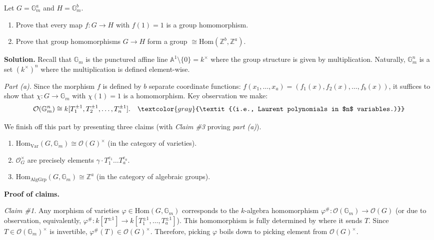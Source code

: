 \documentclass{template}
\begin{document}
\begin{problem}[Exercise 2]
    Let $G=\mathbb{G}_m^a$ and $H=\mathbb{G}_m^b$.
    \begin{enumerate}
        \item[(a)] Prove that every map $f: G \to H$ with $f(1)=1$ is a group homomorphism.
        \item[(b)] Prove that group homomorphisms $G \to H$ form a group $\cong\text{Hom}(\mathbb{Z}^b, \mathbb{Z}^a)$.
    \end{enumerate}
\end{problem}

\textbf{Solution.} Recall that $\mathbb{G}_m$ is the punctured affine line 
$\mathbb{A}^{1} \setminus \{0\} = k^{\times}$ where the group structure is given 
by multiplication. Naturally, $\mathbb{G}_m^n$ is a set $(k^{\times})^n$
where the multiplication is defined element-wise. 

\textcolor{blue!70!black}{\textit{Part (a).}} Since the morphism $f$ is defined by $b$ separate coordinate
functions: $f(x_1,\dots,x_a) =
(f_1(x),f_2(x),\dots,f_b(x))$, it suffices to show
that $\chi: G \to \mathbb{G}_m$ with $\chi(1)=1$ is a homomorphism. Key 
observation we make:
\begin{equation*}
    \mathcal{O}(\mathbb{G}_m^n) \cong k[T_1^{\pm 1}, T_2^{\pm 1}, \dots, T_n^{\pm 1}]. \hspace{10px} \textcolor{gray}{\textit{(i.e., Laurent polynomials in $n$ variables.)}}
\end{equation*}

We finish off this part by presenting three claims (with \textit{Claim \#3} proving 
\textit{part (a)}).
\begin{enumerate}[label=\textbf{Claim \#\arabic*}, align=left]
    \item $\text{Hom}_{\text{Var}}(G,\mathbb{G}_m) \cong \mathcal{O}(G)^{\times}$ (in the category of varieties).
    \item $\mathcal{O}_G^{\times}$ are precisely elements $\gamma \cdot T_1^{e_1}\dots T_a^{e_a}$.
    \item $\text{Hom}_{\text{AlgGrp}}(G,\mathbb{G}_m) \cong \mathbb{Z}^a$ (in the category of algebraic groups).
\end{enumerate}

\textbf{Proof of claims.}

\textit{Claim \#1.} Any morphism of varieties $\varphi \in
\text{Hom}(G,\mathbb{G}_m)$ corresponds to the $k$-algebra homomorphism
$\varphi^{\#}: \mathcal{O}(\mathbb{G}_m) \to \mathcal{O}(G)$ (or due to
observation, equivalently, $\varphi^{\#}: k[T^{\pm 1}] \to k[T_1^{\pm
1},\dots,T_a^{\pm 1}]$). This homomorphism is fully determined by where it sends
$T$. Since $T \in \mathcal{O}(\mathbb{G}_m)^{\times}$ is invertible,
$\varphi^{\#}(T) \in \mathcal{O}(G)^{\times}$. Therefore, picking $\varphi$
boils down to picking element from $\mathcal{O}(G)^{\times}$.
\end{document}
